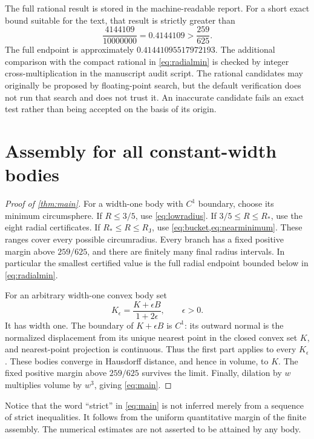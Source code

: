 \documentclass[11pt]{article}
\numberwithin{equation}{section}
\theoremstyle{definition}\newtheorem{definition}[theorem]{Definition}
\theoremstyle{remark}\newtheorem{remark}[theorem]{Remark}
\newcommand{\RJ}{R_{\mathrm J}}
\newcommand{\RS}{R_*}
\begin{document}
The full rational result is stored in the machine-readable report. For a
short exact bound suitable for the text, that result is strictly greater than
\begin{equation}\label{eq:radialmin}
 \frac{4144109}{10000000}=0.4144109>\frac{259}{625}.
\end{equation}
The full endpoint is approximately $0.41441095517972193$. The additional
comparison with the compact rational in \cref{eq:radialmin} is checked by
integer cross-multiplication in the manuscript audit script.
The rational candidates may originally be proposed by floating-point search,
but the default verification does not run that search and does not trust
it. An inaccurate candidate fails an exact test rather than being accepted
on the basis of its origin.

\section{Assembly for all constant-width bodies}\label{sec:assembly}
\begin{proof}[Proof of \cref{thm:main}]
For a width-one body with $C^1$ boundary, choose its minimum circumsphere.
If $R\le3/5$, use \cref{eq:lowradius}. If $3/5\le R\le\RS$, use the eight
radial certificates. If $\RS\le R\le\RJ$, use
\cref{eq:bucket,eq:nearminimum}. These ranges cover every possible
circumradius. Every branch has a fixed positive margin above $259/625$,
and there are finitely many final radius intervals. In particular the
smallest certified value is the full radial endpoint bounded below in \cref{eq:radialmin}.

For an arbitrary width-one convex body set
\[
 K_\epsilon=\frac{K+\epsilon B}{1+2\epsilon},\qquad\epsilon>0.
\]
It has width one. The boundary of $K+\epsilon B$ is $C^1$: its outward normal
is the normalized displacement from its unique nearest point in the closed
convex set $K$, and nearest-point projection is continuous. Thus the first
part applies to every $K_\epsilon$. These bodies converge in Hausdorff
distance, and hence in volume, to $K$. The fixed positive margin above
$259/625$ survives the limit. Finally, dilation by $w$ multiplies volume by
$w^3$, giving \cref{eq:main}.
\end{proof}

Notice that the word ``strict'' in \cref{eq:main} is not inferred merely from
a sequence of strict inequalities. It follows from the uniform quantitative
margin of the finite assembly. The numerical estimates are not asserted to
be attained by any body.
\end{document}
